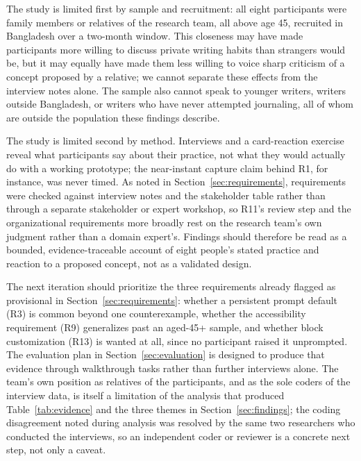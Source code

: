 \documentclass[sigconf,nonacm]{acmart}
\begin{document}
The study is limited first by sample and recruitment: all eight
participants were family members or relatives of the research team, all
above age 45, recruited in Bangladesh over a two-month window. This
closeness may have made participants more willing to discuss private
writing habits than strangers would be, but it may equally have made them
less willing to voice sharp criticism of a concept proposed by a relative;
we cannot separate these effects from the interview notes alone. The
sample also cannot speak to younger writers, writers outside Bangladesh, or
writers who have never attempted journaling, all of whom are outside the
population these findings describe.

The study is limited second by method. Interviews and a card-reaction
exercise reveal what participants say about their practice, not what they
would actually do with a working prototype; the near-instant capture claim
behind R1, for instance, was never timed. As noted in
Section~\ref{sec:requirements}, requirements were checked against
interview notes and the stakeholder table rather than through a separate
stakeholder or expert workshop, so R11's review step and the organizational
requirements more broadly rest on the research team's own judgment rather
than a domain expert's. Findings should therefore be read as a bounded,
evidence-traceable account of eight people's stated practice and reaction
to a proposed concept, not as a validated design.

The next iteration should prioritize the three requirements already flagged
as provisional in Section~\ref{sec:requirements}: whether a persistent
prompt default (R3) is common beyond one counterexample, whether the
accessibility requirement (R9) generalizes past an aged-45+ sample, and
whether block customization (R13) is wanted at all, since no participant
raised it unprompted. The evaluation plan in Section~\ref{sec:evaluation}
is designed to produce that evidence through walkthrough tasks rather than
further interviews alone. The team's own position as relatives of the
participants, and as the sole coders of the interview data, is itself a
limitation of the analysis that produced Table~\ref{tab:evidence} and the
three themes in Section~\ref{sec:findings}; the coding disagreement noted
during analysis was resolved by the same two researchers who conducted the
interviews, so an independent coder or reviewer is a concrete next step,
not only a caveat.
\end{document}
